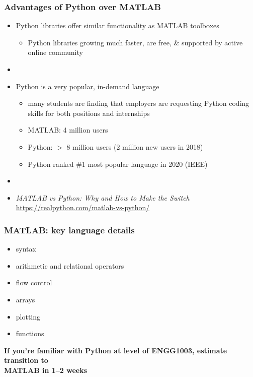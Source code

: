 \documentclass[english,14pt]{beamer}
\begin{document}

\begin{frame}[fragile]

\frametitle{Advantages of Python over MATLAB}

\begin{itemize}
	\item Python libraries offer similar functionality as MATLAB toolboxes
	\begin{itemize}
		\item Python libraries growing much faster, are free, \& supported by active online community 
	\end{itemize}
	\item[]
	\item Python is a very popular, in-demand language
	\begin{itemize}
		\item many students are finding that employers are requesting Python coding skills for both positions and internships
		\item MATLAB: 4 million users
		\item Python: $>$ 8 million users (2 million new users in 2018)
		\item Python ranked \#1 most popular language in 2020 (IEEE)
	\end{itemize}
	\item[]
	\item {\small \emph{MATLAB vs Python: Why and How to Make the Switch}}\\
\href{https://realpython.com/matlab-vs-python/}{https://realpython.com/matlab-vs-python/}
\end{itemize}

\end{frame}


\begin{frame}[fragile]

\frametitle{MATLAB: key language details}

\begin{itemize}
	\item syntax
	\item arithmetic and relational operators
	\item flow control
	\item arrays
	\item plotting
	\item functions
\end{itemize}

\begin{center}
\textbf{If you're familiar with Python at level of ENGG1003, estimate transition to \\ MATLAB in 1--2 weeks}
\end{center}

\end{frame}
\end{document}
